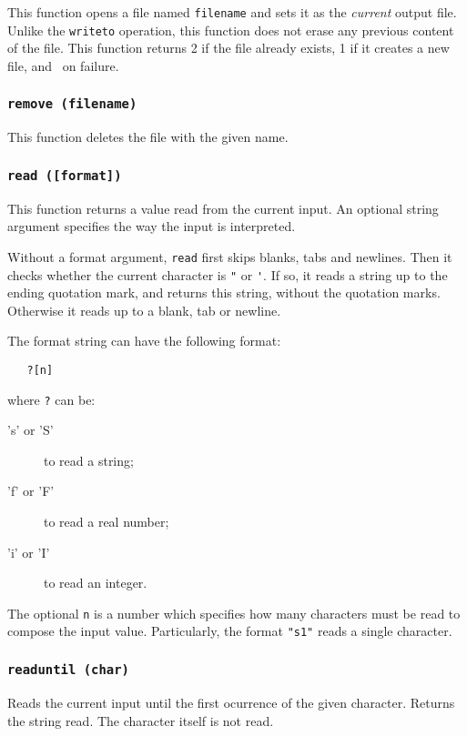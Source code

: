 This function opens a file named \verb'filename' and sets it as the
{\em current} output file.
Unlike the \verb'writeto' operation,
this function does not erase any previous content of the file.
This function returns 2 if the file already exists,
1 if it creates a new file, and \nil\ on failure.

\subsubsection*{{\tt remove (filename)}}

This function deletes the file with the given name.

\subsubsection*{{\tt read ([format])}}

This function returns a value read from the current input.
An optional string argument specifies the way the input is interpreted.

Without a format argument, {\tt read} first skips blanks, tabs and newlines.
Then it checks whether the current character is \verb'"' or \verb-'-.
If so, it reads a string up to the ending quotation mark,
and returns this string, without the quotation marks.
Otherwise it reads up to a blank, tab or newline.

The format string can have the following format:
\begin{verbatim}
   ?[n]
\end{verbatim}
where \verb'?' can be:
\begin{description}
\item['s' or 'S'] to read a string;
\item['f' or 'F'] to read a real number;
\item['i' or 'I'] to read an integer.
\end{description}
The optional \verb'n' is a number which specifies how many characters
must be read to compose the input value.
Particularly, the format \verb'"s1"' reads a single character.

\subsubsection*{{\tt readuntil (char)}}

Reads the current input until the first ocurrence of the given character.
Returns the string read.
The character itself is not read.

